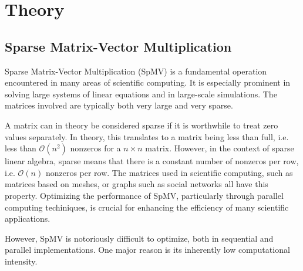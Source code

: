 
\chapter{Theory}

\section{Sparse Matrix-Vector Multiplication}
Sparse Matrix-Vector Multiplication (SpMV) is a fundamental operation encountered in many areas of scientific computing. It is especially prominent in solving large systems of linear equations and in large-scale simulations. The matrices involved are typically both very large and very sparse. 

A matrix can in theory be considered sparse if it is worthwhile to treat zero values separately. In theory, this translates to a matrix being less than full, i.e. less than \( \mathcal{O}\left(n^2\right)\) nonzeros for a \(n \times  n\) matrix. However, in the context of sparse linear algebra, sparse means that there is a constant number of nonzeros per row, i.e. \(\mathcal{O}\left(n\right)\) nonzeros per row. The matrices used in scientific computing, such as matrices based on meshes, or graphs such as social networks all have this property. Optimizing the performance of SpMV, particularly through parallel computing techiniques, is crucial for enhancing the efficiency of many scientific applications.

However, SpMV is notoriously difficult to optimize, both in sequential and parallel implementations. One major reason is its inherently low computational intensity.





